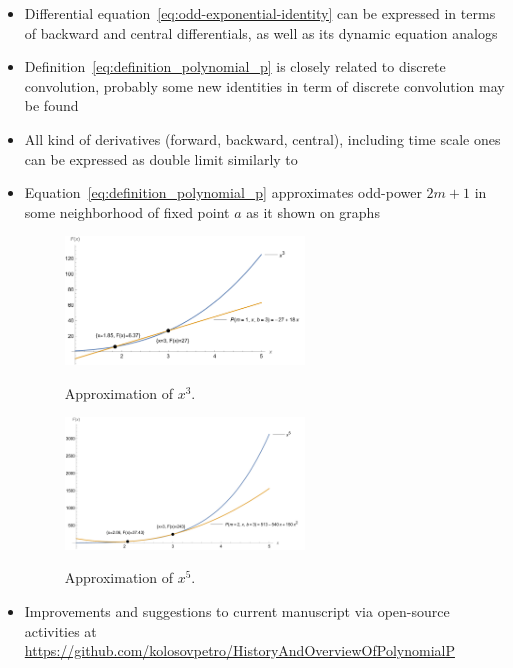 \begin{itemize}
    \item Differential equation~\eqref{eq:odd-exponential-identity} can be expressed in terms of backward
    and central differentials, as well as its dynamic equation analogs~\cite{kolosov2016study}
    \item Definition~\eqref{eq:definition_polynomial_p} is closely related to discrete convolution, probably
    some new identities in term of discrete convolution may be found
    \item All kind of derivatives (forward, backward, central), including time scale ones can be expressed
    as double limit similarly to~\cite{kolosov_2024_10575485}
    \item Equation~\eqref{eq:definition_polynomial_p} approximates odd-power $2m+1$ in some neighborhood of fixed point
    $a$ as it shown on graphs
    \begin{figure}[H]
        \centering
        \includegraphics[width=0.6\textwidth]{images/n^3_approximation_m1_b3}
        ~\caption{Approximation of $x^3$.}\label{fig:approximation-n3}
    \end{figure}
    \begin{figure}[H]
        \centering
        \includegraphics[width=0.6\textwidth]{images/n^5_approximation_m2_b3}
        ~\caption{Approximation of $x^5$.}\label{fig:approximation-n5}
    \end{figure}
    \item Improvements and suggestions to current manuscript via open-source activities at
    \url{https://github.com/kolosovpetro/HistoryAndOverviewOfPolynomialP}
\end{itemize}
